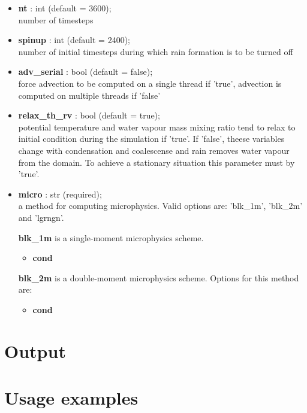 \documentclass[11pt]{article}
\begin{document}
\begin{itemize}
\item \textbf{nt} : int (default = 3600);\\ number of timesteps
\item \textbf{spinup} : int (default = 2400);\\ number of initial timesteps during which rain formation is to be turned off
\item \textbf{adv\_serial} : bool (default = false);\\ force advection to be computed on a single thread if 'true', advection is computed on multiple threads if 'false'
\item \textbf{relax\_th\_rv} : bool (default = true);\\ potential temperature and water vapour mass mixing ratio tend to relax to initial condition during the simulation if 'true'. If 'false', theese variables change with condensation and coalescense and rain removes water vapour from the domain. To achieve a stationary situation this parameter must by 'true'.
\item \textbf{micro} : str (required);\\ a method for computing microphysics. Valid options are: 'blk\_1m', 'blk\_2m' and 'lgrngn'.
 
\textbf{blk\_1m} is a single-moment microphysics scheme. 
\begin{itemize}
\item \textbf{cond}
\end{itemize}



\textbf{blk\_2m} is a double-moment microphysics scheme. Options for this method are:
\begin{itemize}
\item \textbf{cond}
\end{itemize}



\end{itemize}

\section{Output}



\section{Usage examples}
\end{document}
